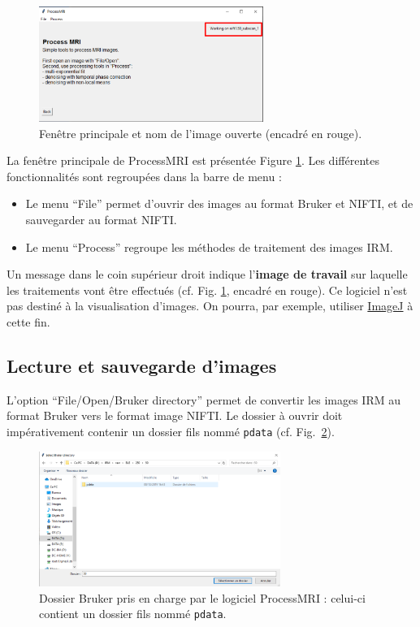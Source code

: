 \documentclass[french]{article}
\begin{document}
\begin{figure}[ht]
  \centering
  \includegraphics[width=0.65\textwidth]{fig/ecran_ppal_nifti_loaded_red}
  \caption{Fenêtre principale et nom de l'image ouverte (encadré en
    rouge).}
  \label{fig:ecran_ppal_nifti_loaded_red}
\end{figure}

La fenêtre principale de ProcessMRI est présentée Figure
\ref{fig:ecran_ppal_nifti_loaded_red}. Les différentes fonctionnalités
sont regroupées dans la barre de menu :
\begin{itemize}
\item Le menu ``File'' permet d'ouvrir des images au format Bruker et
  NIFTI, et de sauvegarder au format NIFTI.
\item Le menu ``Process'' regroupe les méthodes de traitement des
  images IRM.
\end{itemize}


Un message dans le coin supérieur droit indique l'\textbf{image de travail} sur
laquelle les traitements vont être effectués (cf. Fig.
\ref{fig:ecran_ppal_nifti_loaded_red}, encadré en rouge). Ce logiciel
n'est pas destiné à la visualisation d'images. On pourra, par exemple,
utiliser \href{https://imagej.nih.gov/ij/download.html}{ImageJ} à
cette fin.

\subsection{Lecture et sauvegarde d'images}
\label{sec:lect-et-sauv}
L'option ``File/Open/Bruker directory'' permet de convertir les images
IRM au format Bruker vers le format image NIFTI. Le dossier à ouvrir
doit impérativement contenir un dossier fils nommé \texttt{pdata} (cf.
Fig.~\ref{fig:open_bruker2}).

\begin{figure}[ht]
  \centering \includegraphics[width=0.7\textwidth]{fig/open_bruker2}
  \caption{Dossier Bruker pris en charge par le logiciel ProcessMRI :
    celui-ci contient un dossier fils nommé \texttt{pdata}.}
  \label{fig:open_bruker2}
\end{figure}
\end{document}
